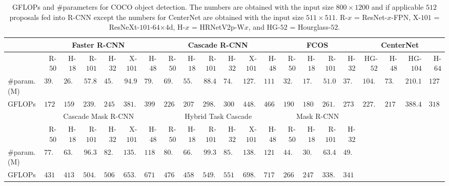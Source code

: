 \documentclass[10pt,journal,compsoc]{IEEEtran}
\begin{document}
\renewcommand{\arraystretch}{1.3}
	\begin{table}[t]
	    \centering\setlength{\tabcolsep}{2pt}
	    \scriptsize
	    \caption{GFLOPs and \#parameters
	    for
	    COCO object detection. 
	    The numbers are obtained
	    with the input size $800 \times 1200$
	    and
	    if applicable
	    $512$ proposals fed into R-CNN
	    except the numbers for CenterNet 
	    are obtained with the input size $511\times511$.
	    R-$x$ = ResNet-$x$-FPN,  
	    X-$101$ = ResNeXt-$101$-$64$$\times$$4$d,
	    H-$x$ = HRNetV2p-W$x$,
	    and HG-$52$ = Hourglass-$52$.
	    }
	    \label{tab:det_GLOPS_Parameter_comparision}
	    \vspace{-.3cm}
	    \begin{tabular}{l|rr|rr|rr|rr|rr|rr|rr|rr|rr|rr}
	        \hline %
	        & \multicolumn{6}{c|}{Faster R-CNN~\cite{HeGDG17}} & \multicolumn{6}{c|}{Cascade R-CNN~\cite{CaiV19}} & \multicolumn{4}{c|}{FCOS~\cite{TianSCH19}} & \multicolumn{4}{c}{CenterNet~\cite{DuanBXQHT19}} \\
	        \hline
	        ~ & R-$50$ & H-$18$& R-$101$ &H-$32$ & X-$101$ & H-$48$ & R-$50$ & H-$18$& R-$101$ &H-$32$ & X-$101$ & H-$48$ & R-$50$ & H-$18$& R-$101$ &H-$32$ & HG-$52$ & H-$48$ & HG-$104$ & H-$64$ \\
	        \hline
	        
	        \hline
	        \#param. (M) & $39.8$ & $26.2$ & $57.8$ & $45.0$ &  $94.9$ & $79.4$ & $69.4$ & $55.1$ & $88.4$ & $74.9$ & $127.3$ & $111.0$ & $32.0$ & $17.5$ & $51.0$ & $37.3$  & $104.8$ & $73.6$ & $210.1$ & $127.7$\\
	        GFLOPs & $172.3$ & $159.1$ & $239.4$ & $245.3$ & $381.8$ &  $399.1$ & $226.2$ & $ 207.8$ & $298.7$ & $ 300.8$ & $448.3$ & $466.5$ & $190.0$ & $180.3$ & $261.2$ & $273.3$ & $227.0$ & $217.1$ & $388.4$ & $318.5$ \\
	        \hline 
	        
	        & \multicolumn{6}{c|}{Cascade Mask R-CNN~\cite{CaiV19}} & \multicolumn{6}{c|}{Hybrid Task Cascade~\cite{ChenPWXLSFLSOLL19}}  & \multicolumn{4}{c|}{Mask R-CNN~\cite{HeGDG17}} \\
	        \cline{1-17}
	        ~ & R-$50$ & H-$18$& R-$101$ &H-$32$ & X-$101$ & H-$48$ & R-$50$ & H-$18$& R-$101$ &H-$32$ & X-$101$ & H-$48$ & R-$50$ & H-$18$& R-$101$ &H-$32$\\
	        \cline{1-17}
	        
	        \#param. (M) & $77.3$ & $63.1$ & $96.3$ & $82.9$ & $135.2$ & $118.9$ & $80.3$ & $66.1$ & $99.3$ & $85.9 $ &  $138.2$ & $121.9$ & $44.4$ & $30.1$ & $63.4$ & $49.9$ \\
            GFLOPs & $431.7$ & $413.1$ & $504.1$ & $506.2$ & $653.7$ & $671.9$ & $476.9$ & $458.3$ & $549.2$ & $551.4$ & $698.9$ & $717.0$ & $266.5$ & $247.9$ & $338.8$ & $341.0$ \\
	        \cline{1-17}
	    \end{tabular} 
	    \vspace{-.2cm}
	\end{table}
\end{document}
